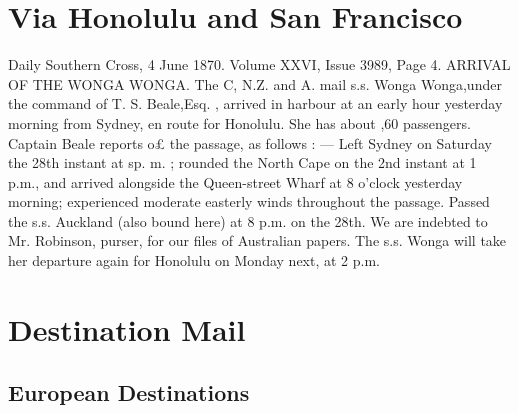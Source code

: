 \documentclass[justified]{tufte-book}
\begin{document}









\chapter{Via Honolulu and San Francisco}
\normalsize

Daily Southern Cross, 4 June 1870. Volume XXVI, Issue 3989, Page 4.
ARRIVAL OF THE WONGA WONGA. The C, N.Z. and A. mail s.s. Wonga Wonga,under the command of T. S. Beale,Esq. , arrived in harbour at an early hour yesterday morning from Sydney, en route for Honolulu. She has about ,60 passengers. Captain Beale reports o£ the passage, as follows : — Left Sydney on Saturday the 28th instant at sp. m. ; rounded the North Cape on the 2nd instant at 1 p.m., and arrived alongside the Queen-street Wharf at 8 o'clock yesterday morning; experienced moderate easterly winds throughout the passage. Passed the s.s. Auckland (also bound here) at 8 p.m. on the 28th. We are indebted to Mr. Robinson, purser, for our files of Australian papers. The s.s. Wonga will take her departure again for Honolulu on Monday next, at 2 p.m.













\chapter{Destination Mail}
\section{European Destinations}
\end{document}
